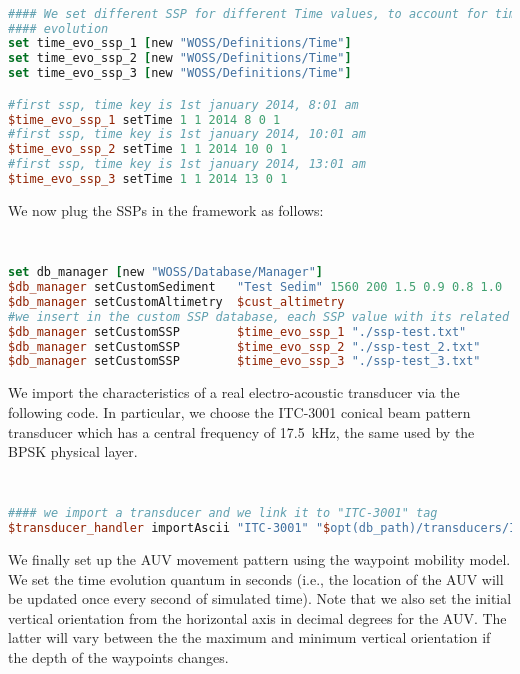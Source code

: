 \documentclass[11pt]{article}
\begin{document}
{\scriptsize\tt
\begin{lstlisting}[language=tcl,showstringspaces=false]
#### We set different SSP for different Time values, to account for time 
#### evolution
set time_evo_ssp_1 [new "WOSS/Definitions/Time"]
set time_evo_ssp_2 [new "WOSS/Definitions/Time"]
set time_evo_ssp_3 [new "WOSS/Definitions/Time"]

#first ssp, time key is 1st january 2014, 8:01 am
$time_evo_ssp_1 setTime 1 1 2014 8 0 1
#first ssp, time key is 1st january 2014, 10:01 am
$time_evo_ssp_2 setTime 1 1 2014 10 0 1
#first ssp, time key is 1st january 2014, 13:01 am
$time_evo_ssp_3 setTime 1 1 2014 13 0 1
\end{lstlisting}
}
\vspace{\baselinestretch\baselineskip}

\noindent We now plug the SSPs in the framework as follows:

{\scriptsize\tt
\begin{lstlisting}[language=tcl,showstringspaces=false]
set db_manager [new "WOSS/Database/Manager"]
$db_manager setCustomSediment   "Test Sedim" 1560 200 1.5 0.9 0.8 1.0
$db_manager setCustomAltimetry  $cust_altimetry
#we insert in the custom SSP database, each SSP value with its related Time key
$db_manager setCustomSSP        $time_evo_ssp_1 "./ssp-test.txt"
$db_manager setCustomSSP        $time_evo_ssp_2 "./ssp-test_2.txt"
$db_manager setCustomSSP        $time_evo_ssp_3 "./ssp-test_3.txt"
\end{lstlisting}
}
\vspace{\baselinestretch\baselineskip}

We import the characteristics of a real electro-acoustic transducer via the following code. 
In particular, we choose the ITC-3001 conical beam pattern transducer which has a central frequency
of 17.5~kHz, the same used by the BPSK physical layer.

{\scriptsize\tt
\begin{lstlisting}[language=tcl,showstringspaces=false]
#### we import a transducer and we link it to "ITC-3001" tag
$transducer_handler importAscii "ITC-3001" "$opt(db_path)/transducers/ITC/ITC-ITC-3001-17.5kHz.txt"
\end{lstlisting}
}
\vspace{\baselinestretch\baselineskip}

We finally set up the AUV movement pattern using the waypoint mobility model. 
We set the time evolution quantum in seconds (i.e., the location of the AUV will be updated once every second of simulated time). 
Note that we also set the initial vertical orientation from the horizontal axis in decimal degrees for the AUV. 
The latter will vary between the the maximum and minimum vertical orientation if the depth of the waypoints changes.
\end{document}

